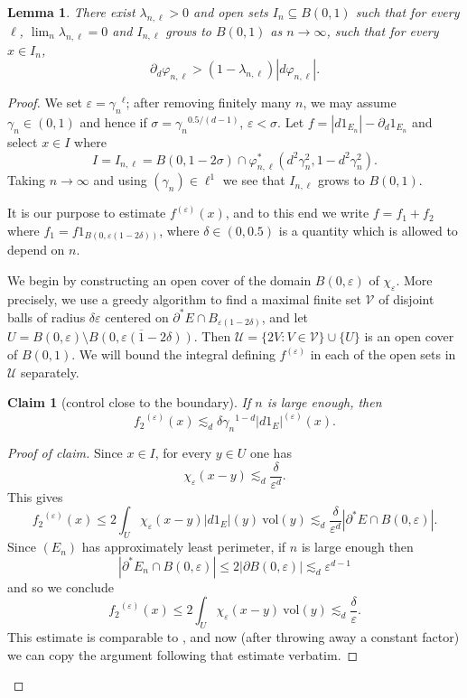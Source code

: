 \documentclass[reqno,12pt,letterpaper]{amsart}
\newcommand{\vol}{\mathrm{vol}}
\newtheorem{lemma}[theorem]{Lemma}
\newtheorem{claim}[theorem]{Claim}
\theoremstyle{definition}
\numberwithin{equation}{section}
\begin{document}
\begin{lemma}
There exist $\lambda_{n,\ell} > 0$ and open sets $I_n \subseteq B(0, 1)$ such that for every $\ell$, $\lim_n \lambda_{n,\ell} = 0$ and $I_{n, \ell}$ grows to $B(0, 1)$ as $n \to \infty$, such that for every $x \in I_n$,
$$\partial_d \varphi_{n,\ell} > (1 - \lambda_{n, \ell}) |d\varphi_{n,\ell}|.$$
\end{lemma}
\begin{proof}
We set $\varepsilon = {\gamma_n}^\ell$; after removing finitely many $n$, we may assume $\gamma_n \in (0, 1)$ and hence if $\sigma = {\gamma_n}^{0.5/(d - 1)}$, $\varepsilon < \sigma$.
Let $f = |d1_{E_n}| - \partial_d 1_{E_n}$ and select $x \in I$ where
$$I = I_{n, \ell} = B(0, 1 - 2\sigma) \cap \varphi_{n, \ell}^*(d^2 \gamma_n^2, 1 - d^2 \gamma_n^2).$$
Taking $n \to \infty$ and using $(\gamma_n) \in \ell^1$ we see that $I_{n, \ell}$ grows to $B(0, 1)$.

It is our purpose to estimate $f^{(\varepsilon)}(x)$, and to this end we write $f = f_1 + f_2$ where $f_1 = f1_{B(0, \varepsilon(1 - 2\delta))}$, where $\delta \in (0, 0.5)$ is a quantity which is allowed to depend on $n$.

We begin by constructing an open cover of the domain $B(0, \varepsilon)$ of $\chi_\varepsilon$.
More precisely, we use a greedy algorithm to find a maximal finite set $\mathcal V$ of disjoint balls of radius $\delta \varepsilon$ centered on $\partial^* E \cap B_{\varepsilon(1 - 2\delta)}$, and let $U = B(0, \varepsilon) \setminus \overline{B(0, \varepsilon(1 - 2\delta))}$.
Then $\mathcal U = \{2V: V \in \mathcal V\} \cup \{U\}$ is an open cover of $B(0, 1)$.
We will bound the integral defining $f^{(\varepsilon)}$ in each of the open sets in $\mathcal U$ separately.

\begin{claim}[control close to the boundary]\label{molly close}
If $n$ is large enough, then
$${f_2}^{(\varepsilon)}(x) \lesssim_d \delta {\gamma_n}^{1 - d} |d1_E|^{(\varepsilon)}(x).$$
\end{claim}
\begin{proof}[Proof of claim]
Since $x \in I$, for every $y \in U$ one has
$$\chi_\varepsilon(x - y) \lesssim_d \frac{\delta}{\varepsilon^d}.$$
This gives
$${f_2}^{(\varepsilon)}(x) \leq 2\int_U \chi_\varepsilon(x - y) |d1_E|(y) ~\vol(y) \lesssim_d \frac{\delta}{\varepsilon^d} |\partial^* E \cap B(0, \varepsilon)|.$$
Since $(E_n)$ has approximately least perimeter, if $n$ is large enough then
$$|\partial^* E_n \cap B(0, \varepsilon)| \leq 2|\partial B(0, \varepsilon)| \lesssim_d \varepsilon^{d - 1}$$
and so we conclude
$${f_2}^{(\varepsilon)}(x) \leq 2\int_U \chi_\varepsilon(x - y) ~\vol(y) \lesssim_d \frac{\delta}{\varepsilon}.$$
This estimate is comparable to \cite[(7.8)]{Giusti77}, and now (after throwing away a constant factor) we can copy the argument following that estimate verbatim.
\end{proof}


\end{proof}
\end{document}
